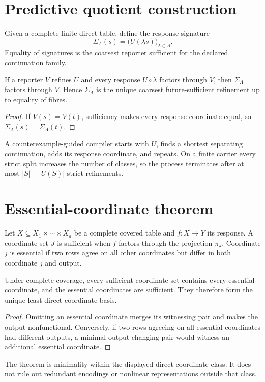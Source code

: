 \documentclass[11pt,a4paper]{article}
\begin{document}
\section{Predictive quotient construction}
Given a complete finite direct table, define the response signature
\begin{equation}
\Sigma_\Lambda(s)=\bigl(U(\lambda s)\bigr)_{\lambda\in\Lambda}.
\end{equation}
Equality of signatures is the coarsest reporter sufficient for the declared continuation family.
\begin{theorem}
If a reporter $V$ refines $U$ and every response $U\circ\lambda$ factors through $V$, then $\Sigma_\Lambda$ factors through $V$. Hence $\Sigma_\Lambda$ is the unique coarsest future-sufficient refinement up to equality of fibres.
\end{theorem}
\begin{proof}
If $V(s)=V(t)$, sufficiency makes every response coordinate equal, so $\Sigma_\Lambda(s)=\Sigma_\Lambda(t)$.
\end{proof}
A counterexample-guided compiler starts with $U$, finds a shortest separating continuation, adds its response coordinate, and repeats. On a finite carrier every strict split increases the number of classes, so the process terminates after at most $|S|-|U(S)|$ strict refinements.

\section{Essential-coordinate theorem}
Let $X\subseteq X_1\times\cdots\times X_d$ be a complete covered table and $f:X\to Y$ its response. A coordinate set $J$ is sufficient when $f$ factors through the projection $\pi_J$. Coordinate $j$ is essential if two rows agree on all other coordinates but differ in both coordinate $j$ and output.
\begin{theorem}
Under complete coverage, every sufficient coordinate set contains every essential coordinate, and the essential coordinates are sufficient. They therefore form the unique least direct-coordinate basis.
\end{theorem}
\begin{proof}
Omitting an essential coordinate merges its witnessing pair and makes the output nonfunctional. Conversely, if two rows agreeing on all essential coordinates had different outputs, a minimal output-changing pair would witness an additional essential coordinate.
\end{proof}
The theorem is minimality within the displayed direct-coordinate class. It does not rule out redundant encodings or nonlinear representations outside that class.
\end{document}
